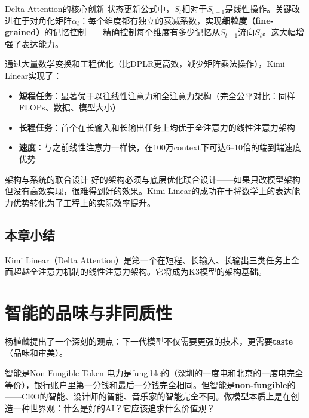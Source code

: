 \documentclass[a4paper]{article}
\begin{document}
\begin{importantbox}{Delta Attention的核心创新}
状态更新公式中，$S_t$相对于$S_{t-1}$是线性操作。关键改进在于对角化矩阵$\alpha_t$：每个维度都有独立的衰减系数，实现\textbf{细粒度（fine-grained）}的记忆控制——精确控制每个维度有多少记忆从$S_{t-1}$流向$S_t$。这大幅增强了表达能力。
\end{importantbox}

通过大量数学变换和工程优化（比DPLR更高效，减少矩阵乘法操作），Kimi Linear实现了：

\begin{itemize}
\item \textbf{短程任务}：显著优于以往线性注意力和全注意力架构（完全公平对比：同样FLOPs、数据、模型大小）
\item \textbf{长程任务}：首个在长输入和长输出任务上均优于全注意力的线性注意力架构
\item \textbf{速度}：与之前线性注意力一样快，在100万context下可达6--10倍的端到端速度优势
\end{itemize}

\begin{warningbox}{架构与系统的联合设计}
好的架构必须与底层优化联合设计——如果只改模型架构但没有高效实现，很难得到好的效果。Kimi Linear的成功在于将数学上的表达能力优势转化为了工程上的实际效率提升。
\end{warningbox}

\subsection{本章小结}

Kimi Linear（Delta Attention）是第一个在短程、长输入、长输出三类任务上全面超越全注意力机制的线性注意力架构。它将成为K3模型的架构基础。


\section{智能的品味与非同质性}

杨植麟提出了一个深刻的观点：下一代模型不仅需要更强的技术，更需要\textbf{taste}（品味和审美）。

\begin{importantbox}{智能是Non-Fungible Token}
电力是fungible的（深圳的一度电和北京的一度电完全等价），银行账户里第一分钱和最后一分钱完全相同。但智能是\textbf{non-fungible}的——CEO的智能、设计师的智能、音乐家的智能完全不同。做模型本质上是在创造一种世界观：什么是好的AI？它应该追求什么价值观？
\end{importantbox}
\end{document}
